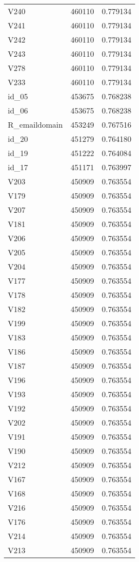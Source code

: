 \begin{tabular}{lrr}
V240 & 460110 & 0.779134 \\
V241 & 460110 & 0.779134 \\
V242 & 460110 & 0.779134 \\
V243 & 460110 & 0.779134 \\
V278 & 460110 & 0.779134 \\
V233 & 460110 & 0.779134 \\
id_05 & 453675 & 0.768238 \\
id_06 & 453675 & 0.768238 \\
R_emaildomain & 453249 & 0.767516 \\
id_20 & 451279 & 0.764180 \\
id_19 & 451222 & 0.764084 \\
id_17 & 451171 & 0.763997 \\
V203 & 450909 & 0.763554 \\
V179 & 450909 & 0.763554 \\
V207 & 450909 & 0.763554 \\
V181 & 450909 & 0.763554 \\
V206 & 450909 & 0.763554 \\
V205 & 450909 & 0.763554 \\
V204 & 450909 & 0.763554 \\
V177 & 450909 & 0.763554 \\
V178 & 450909 & 0.763554 \\
V182 & 450909 & 0.763554 \\
V199 & 450909 & 0.763554 \\
V183 & 450909 & 0.763554 \\
V186 & 450909 & 0.763554 \\
V187 & 450909 & 0.763554 \\
V196 & 450909 & 0.763554 \\
V193 & 450909 & 0.763554 \\
V192 & 450909 & 0.763554 \\
V202 & 450909 & 0.763554 \\
V191 & 450909 & 0.763554 \\
V190 & 450909 & 0.763554 \\
V212 & 450909 & 0.763554 \\
V167 & 450909 & 0.763554 \\
V168 & 450909 & 0.763554 \\
V216 & 450909 & 0.763554 \\
V176 & 450909 & 0.763554 \\
V214 & 450909 & 0.763554 \\
V213 & 450909 & 0.763554 \\

\end{tabular}
